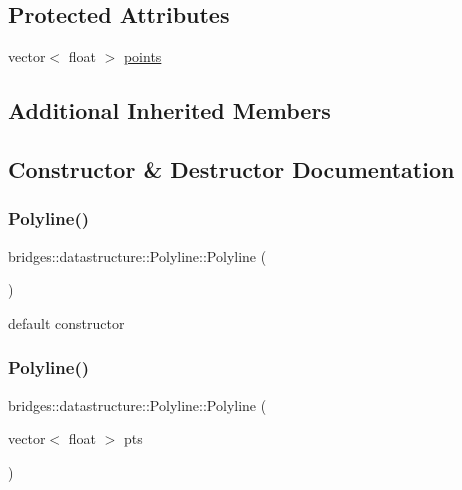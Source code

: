 \subsection*{Protected Attributes}
\begin{DoxyCompactItemize}
\item 
vector$<$ float $>$ \hyperlink{classbridges_1_1datastructure_1_1_polyline_a0df21b6c3cc82930a93a495de5affda7}{points}
\end{DoxyCompactItemize}
\subsection*{Additional Inherited Members}


\subsection{Constructor \& Destructor Documentation}
\mbox{\label{classbridges_1_1datastructure_1_1_polyline_a488f6612485fc66534035c3574281a11}} 
\subsubsection{\texorpdfstring{Polyline()}{Polyline()}\hspace{0.1cm}{\footnotesize\ttfamily [1/2]}}
{\footnotesize\ttfamily bridges\+::datastructure\+::\+Polyline\+::\+Polyline (\begin{DoxyParamCaption}{ }\end{DoxyParamCaption})\hspace{0.3cm}{\ttfamily [inline]}}



default constructor 

\mbox{\label{classbridges_1_1datastructure_1_1_polyline_aceb69c3294ab4c16b2931e1073d3f996}} 
\subsubsection{\texorpdfstring{Polyline()}{Polyline()}\hspace{0.1cm}{\footnotesize\ttfamily [2/2]}}
{\footnotesize\ttfamily bridges\+::datastructure\+::\+Polyline\+::\+Polyline (\begin{DoxyParamCaption}\item[{vector$<$ float $>$}]{pts }\end{DoxyParamCaption})\hspace{0.3cm}{\ttfamily [inline]}}



